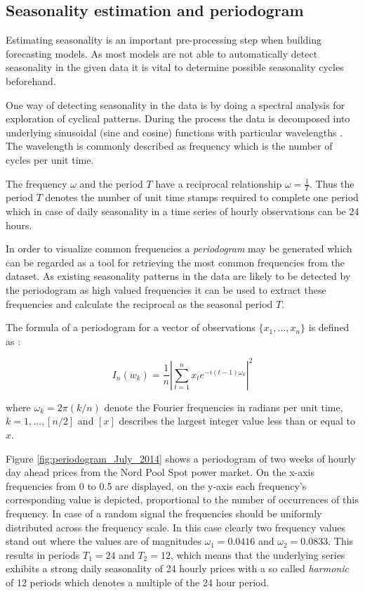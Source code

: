 
\subsection{Seasonality estimation and periodogram}

Estimating seasonality is an important pre-processing step when building forecasting models. As most models are not able to automatically detect seasonality in the given data it is vital to determine possible seasonality cycles beforehand. 

One way of detecting seasonality in the data is by doing a spectral analysis for exploration of cyclical patterns. 
During the process the data is decomposed into underlying sinusoidal (sine and cosine) functions with particular wavelengths \cite{weron2007modeling}. 
The wavelength is commonly described as frequency which is the number of cycles per unit time. 

The frequency $\omega$ and the period $T$ have a reciprocal relationship $\omega = \frac{1}{T}$. Thus the period $T$ denotes the number of unit time stamps required to complete one period which in case of daily seasonality in a time series of hourly observations can be 24 hours. 

In order to visualize common frequencies a \textit{periodogram} may be generated which can be regarded as a tool for retrieving the most common frequencies from the dataset. As existing seasonality patterns in the data are likely to be detected by the periodogram as high valued frequencies it can be used to extract these frequencies and calculate the reciprocal as the seasonal period $T$. 

The formula of a periodogram for a vector of observations $\{x_1,\ldots,x_n\}$ is defined as \cite{weron2007modeling}:

		\[ I_n (w_k) = \frac{1}{n} \left| \sum_{t=1}^{n}{x_t  e^{-i(t-1) \omega_k} } \right|^2 \]
		
		where $\omega_k = 2 \pi (k/n)$ denote the Fourier frequencies in radians per unit time, $k = 1,\ldots,[n/2]$ and $[x]$ describes the largest integer value less than or equal to $x$. 

Figure \ref{fig:periodogram_July_2014} shows a periodogram of two weeks of hourly day ahead prices from the Nord Pool Spot power market. 
On the x-axis frequencies from 0 to 0.5 are displayed, on the y-axis each frequency's corresponding value is depicted, proportional to the number of occurrences of this frequency. In case of a random signal the frequencies should be uniformly distributed across the frequency scale. In this case clearly two frequency values stand out where the values are of magnitudes $\omega_1 = 0.0416$ and $\omega_2 = 0.0833$. This results in periods $T_1 = 24$ and $T_2 = 12$, which means that the underlying series exhibits a strong daily seasonality of 24 hourly prices with a so called \textit{harmonic} of 12 periods which denotes a multiple of the 24 hour period. 


